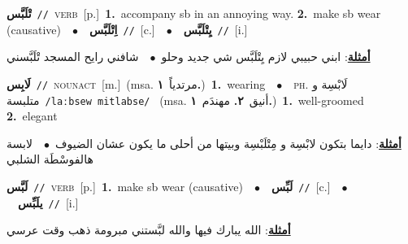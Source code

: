 \documentclass[10pt,a4paper,twoside]{article} %
\begin{document}
\begin{multicols}{2}
{\setlength\topsep{0pt}\textbf{\foreignlanguage{arabic}{تْلَبَّس}}\ {\color{gray}\texttt{//}\color{black}}\ \textsc{verb}\ [p.]\ \textbf{1.}~accompany sb in an annoying way.  \textbf{2.}~make sb wear (causative)\ \ $\bullet$\ \ \setlength\topsep{0pt}\textbf{\foreignlanguage{arabic}{اِتْلَبَّس}}\ {\color{gray}\texttt{//}\color{black}}\ [c.]\ \ $\bullet$\ \ \setlength\topsep{0pt}\textbf{\foreignlanguage{arabic}{يِتْلَبَّس}}\ {\color{gray}\texttt{//}\color{black}}\ [i.]\  \begin{flushright}\color{gray}\foreignlanguage{arabic}{\textbf{\underline{\foreignlanguage{arabic}{أمثلة}}}: ابني حبيبي لازم يِتْلَبَّس شي جديد وحلو\ $\bullet$\ \  شافني رايح المسجد تْلَبَّسني}\end{flushright}\color{black}} \vspace{2mm}

{\setlength\topsep{0pt}\textbf{\foreignlanguage{arabic}{لَابِس}}\ {\color{gray}\texttt{//}\color{black}}\ \textsc{noun\textunderscore act}\ [m.]\ \color{gray}(msa. \foreignlanguage{arabic}{مرتدياً}~\foreignlanguage{arabic}{\textbf{١.}})\color{black}\ \textbf{1.}~wearing\ \ $\bullet$\ \ \textsc{ph.} \color{gray} \foreignlanguage{arabic}{لَابْسِة و متلبسة}\color{black}\ {\color{gray}\texttt{/{\sffamily laːbsew mitlabse}/}\color{black}}\ \color{gray} (msa. \foreignlanguage{arabic}{أنيق}~\foreignlanguage{arabic}{\textbf{٢.}}  \foreignlanguage{arabic}{مهندَم}~\foreignlanguage{arabic}{\textbf{١.}})\color{black}\ \textbf{1.}~well-groomed  \textbf{2.}~elegant\  \begin{flushright}\color{gray}\foreignlanguage{arabic}{\textbf{\underline{\foreignlanguage{arabic}{أمثلة}}}: دايما بتكون لابْسِة و مِتْلَبْسِة وبيتها من أحلى ما يكون عشان الضيوف\ $\bullet$\ \  لابسة هالفوسْطَة الشلبي}\end{flushright}\color{black}} \vspace{2mm}

{\setlength\topsep{0pt}\textbf{\foreignlanguage{arabic}{لَبَّس}}\ {\color{gray}\texttt{//}\color{black}}\ \textsc{verb}\ [p.]\ \textbf{1.}~make sb wear (causative)\ \ $\bullet$\ \ \setlength\topsep{0pt}\textbf{\foreignlanguage{arabic}{لَبِّس}}\ {\color{gray}\texttt{//}\color{black}}\ [c.]\ \ $\bullet$\ \ \setlength\topsep{0pt}\textbf{\foreignlanguage{arabic}{يلَبِّس}}\ {\color{gray}\texttt{//}\color{black}}\ [i.]\  \begin{flushright}\color{gray}\foreignlanguage{arabic}{\textbf{\underline{\foreignlanguage{arabic}{أمثلة}}}: الله يبارك فيها والله لبَّستني مبرومة ذهب وقت عرسي}\end{flushright}\color{black}} \vspace{2mm}


\end{multicols}
\end{document}
